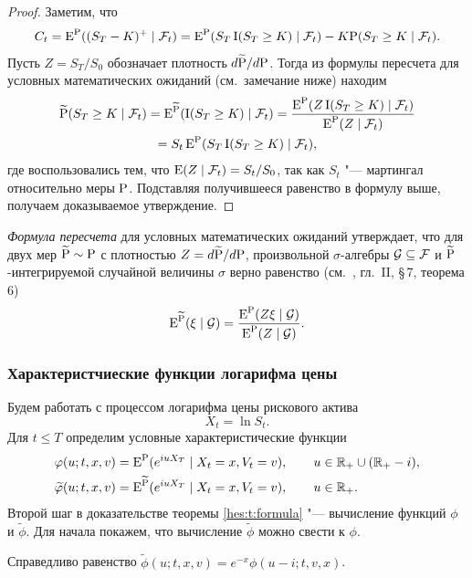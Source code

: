 \begin{proof}
Заметим, что
\[
C_t = \E^\P((S_T - K)^+\mid \F_t) = \E^\P(S_T \I(S_T\ge K) \mid \F_t) - K\P(S_T\ge K\mid \F_t).
\]
Пусть $Z = S_T/S_0$ обозначает плотность $d\tilde\P/d\P$. 
Тогда из формулы пересчета для условных математических ожиданий (см.~замечание ниже) находим
\begin{multline*}
\tilde\P(S_T\ge K\mid \F_t) = \E^{\tilde\P} (\I(S_T \ge K) \mid \F_t)
= \frac{\E^{\P}(Z \I(S_T \ge K)\mid \F_t)}{\E^{\P}(Z\mid \F_t)} \\= S_t \E^{\P}(S_T \I(S_T\ge K)\mid \F_t),
\end{multline*}
где воспользовались тем, что $\E(Z\mid \F_t) = S_t/S_0$, так как $S_t$ "--- мартингал относительно меры $\P$.
Подставляя получившееся равенство в формулу выше, получаем доказываемое утверждение.
\end{proof}

\begin{remark}
\emph{Формула пересчета} для условных математических ожиданий утверждает, что для двух мер $\tilde\P \sim \P$ с плотностью $Z=d\tilde\P/d\P$, произвольной $\sigma$-алгебры $\G\subseteq\F$ и $\tilde\P$-интегрируемой случайной величины $\sigma$ верно равенство (см.~\cite{Shiryaev04}, гл.~II, \S\,7, теорема 6)
\[
\E^{\tilde \P}(\xi\mid \G) = \frac{\E^{\P}(Z\xi\mid \G)}{\E^\P(Z\mid \G)}.
\]
\end{remark}


\subsubsection{Характеристчиеские функции логарифма цены}

Будем работать с процессом логарифма цены рискового актива
\[
X_t = \ln S_t.
\]
Для $t\le T$ определим условные характеристические функции
\begin{align*}
&\phi(u; t,x,v) = \E^{\P} (e^{iu X_T} \mid X_t=x, V_t = v), \qquad u\in\R_+ \cup (\R_+-i),\\
&\tilde\phi(u; t,x,v) = \E^{\tilde\P} (e^{iu X_T} \mid X_t=x, V_t = v), \qquad u\in\R_+ .
\end{align*}
Второй шаг в доказательстве теоремы \ref{hes:t:formula} "--- вычисление функций $\phi$ и $\tilde\phi$.
Для начала покажем, что вычисление $\tilde\phi$ можно свести к $\phi$.

\begin{lemma}
Справедливо равенство $\tilde \phi(u; t,x,v) = e^{-x}\phi(u-i;t,v,x)$.
\end{lemma}

